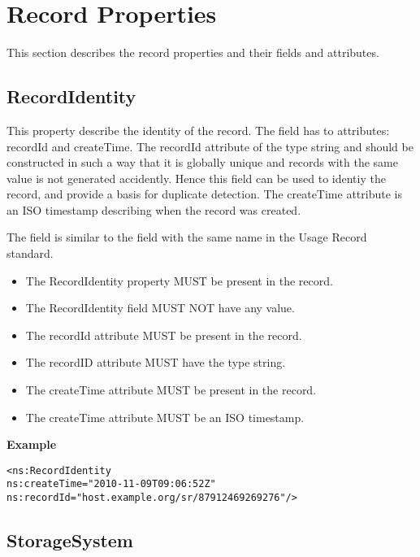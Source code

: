 
\section{Record Properties}

This section describes the record properties and their fields and attributes.



\subsection{RecordIdentity}

This property describe the identity of the record. The field has to attributes:
recordId and createTime. The recordId attribute of the type string and should
be constructed in such a way that it is globally unique and records with the
same value is not generated accidently. Hence this field can be used to identiy
the record, and provide a basis for duplicate detection. The createTime
attribute is an ISO timestamp describing when the record was created.

The field is similar to the field with the same name in the Usage Record
standard.

\begin{itemize}
\item The RecordIdentity property MUST be present in the record.
\item The RecordIdentity field MUST NOT have any value.
\item The recordId attribute MUST be present in the record.
\item The recordID attribute MUST have the type string.
\item The createTime attribute MUST be present in the record.
\item The createTime attribute MUST be an ISO timestamp.
\end{itemize}

{\bf Example}
\begin{verbatim}
<ns:RecordIdentity
ns:createTime="2010-11-09T09:06:52Z"
ns:recordId="host.example.org/sr/87912469269276"/>
\end{verbatim}


\subsection{StorageSystem}

